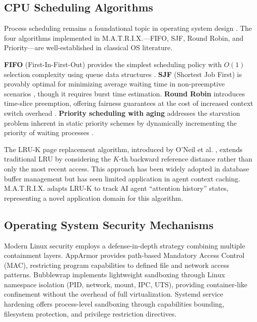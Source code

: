 \documentclass[conference]{IEEEtran}
\begin{document}
\subsection{CPU Scheduling Algorithms}

Process scheduling remains a foundational topic in operating system design \cite{silberschatz2018os, tanenbaum2015modern}. The four algorithms implemented in M.A.T.R.I.X.---FIFO, SJF, Round Robin, and Priority---are well-established in classical OS literature.

\textbf{FIFO} (First-In-First-Out) provides the simplest scheduling policy with $O(1)$ selection complexity using queue data structures \cite{stallings2018os}. \textbf{SJF} (Shortest Job First) is provably optimal for minimizing average waiting time in non-preemptive scenarios \cite{silberschatz2018os}, though it requires burst time estimation. \textbf{Round Robin} introduces time-slice preemption, offering fairness guarantees at the cost of increased context switch overhead \cite{tanenbaum2015modern}. \textbf{Priority scheduling with aging} addresses the starvation problem inherent in static priority schemes by dynamically incrementing the priority of waiting processes \cite{stallings2018os}.

The LRU-K page replacement algorithm, introduced by O'Neil et al. \cite{oneil1993lruk}, extends traditional LRU by considering the $K$-th backward reference distance rather than only the most recent access. This approach has been widely adopted in database buffer management but has seen limited application in agent context caching. M.A.T.R.I.X. adapts LRU-K to track AI agent ``attention history'' states, representing a novel application domain for this algorithm.

\subsection{Operating System Security Mechanisms}

Modern Linux security employs a defense-in-depth strategy combining multiple containment layers. AppArmor \cite{apparmor2024} provides path-based Mandatory Access Control (MAC), restricting program capabilities to defined file and network access patterns. Bubblewrap \cite{bubblewrap2024} implements lightweight sandboxing through Linux namespace isolation (PID, network, mount, IPC, UTS), providing container-like confinement without the overhead of full virtualization. Systemd service hardening \cite{systemd2024} offers process-level sandboxing through capabilities bounding, filesystem protection, and privilege restriction directives.
\end{document}
